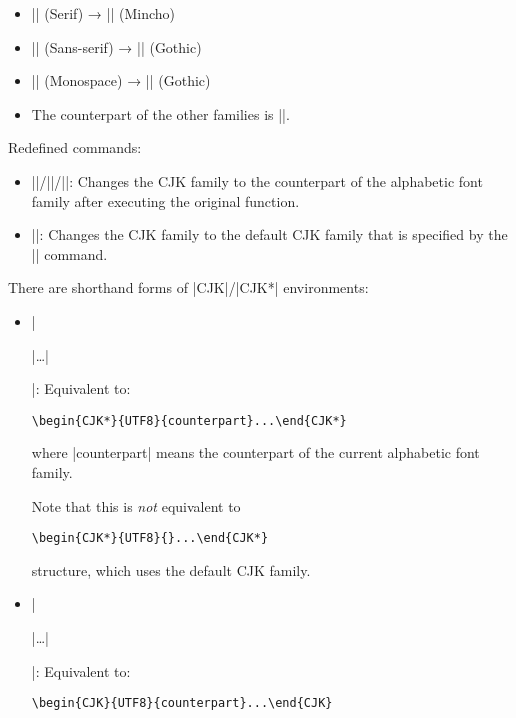 \documentclass[a4paper]{article}
\newcommand{\Means}{:\hspace{1em plus 1em}}
\newcommand{\wbr}{\linebreak[0]}
\begin{document}
\begin{itemize}
\item |\rmfamily| (Serif) → |\mcfamily| (Mincho)
\item |\sffamily| (Sans-serif) → |\gtfamily| (Gothic)
\item |\ttfamily| (Monospace) → |\gtfamily| (Gothic)
\item The counterpart of the other families is |\mcfamily|.
\end{itemize}

Redefined commands:

\begin{itemize}
\item |\rmfamily|/|\sffamily|/|\ttfamily|\Means
  Changes the CJK family to the counterpart of the alphabetic font
  family after executing the original function.
\item |\normalfont|\Means
  Changes the CJK family to the default CJK family that is specified
  by the |\setCJKfamilydefault| command.
\end{itemize}

There are shorthand forms of |CJK|/\wbr|CJK*| environments:

\begin{itemize}
\item |\begin{uCJK*}|\ldots|\end{uCJK*}|\Means
  Equivalent to:
\begin{verbatim}
\begin{CJK*}{UTF8}{counterpart}...\end{CJK*}
\end{verbatim}
  where |counterpart| means the counterpart of the current alphabetic
  font family.

  Note that this is \emph{not} equivalent to
\begin{verbatim}
\begin{CJK*}{UTF8}{}...\end{CJK*}
\end{verbatim}
  structure, which uses the default CJK family.
\item |\begin{uCJK}|\ldots|\end{uCJK}|\Means
  Equivalent to:
\begin{verbatim}
\begin{CJK}{UTF8}{counterpart}...\end{CJK}
\end{verbatim}
\end{itemize}
\end{document}
